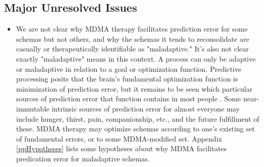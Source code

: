 \documentclass[12pt,letterpaper]{book}
\begin{document}
\subsection*{Major Unresolved Issues}
\begin{itemize}
    \item We are not clear why MDMA therapy facilitates prediction error for some schemas but not others, and why the schemas it tends to reconsolidate are casually or therapeutically identifiable as "maladaptive." It's also not clear exactly "maladaptive" means in this context. A process can only be adaptive or maladaptive in relation to a goal or optimization function. Predictive processing posits that the brain's fundamental optimization function is minimization of prediction error, but it remains to be seen which particular sources of prediction error that function contains in most people \cite{clark2015surfing}. Some near-immutable intrinsic sources of prediction error for almost everyone may include hunger, thirst, pain, companionship, etc., and the future fulfillment of these. MDMA therapy may optimize schemas according to one's existing set of fundamental errors, or to some MDMA-modified set. Appendix \ref{ppHypotheses} lists some hypotheses about why MDMA facilitates predication error for maladaptive schemas.
    

\end{itemize}
\end{document}
